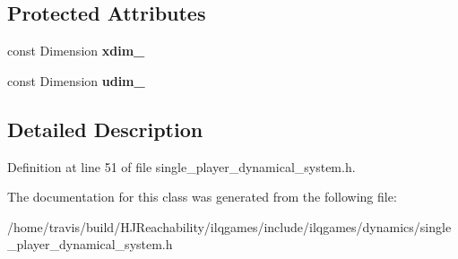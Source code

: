 \subsection*{Protected Attributes}
\begin{DoxyCompactItemize}
\item 
const Dimension {\bfseries xdim\+\_\+}\hypertarget{classilqgames_1_1_single_player_dynamical_system_a556a93c620d076cf36acd55aff69a02f}{}\label{classilqgames_1_1_single_player_dynamical_system_a556a93c620d076cf36acd55aff69a02f}

\item 
const Dimension {\bfseries udim\+\_\+}\hypertarget{classilqgames_1_1_single_player_dynamical_system_ad7058a359156f603a03323a3abf3de39}{}\label{classilqgames_1_1_single_player_dynamical_system_ad7058a359156f603a03323a3abf3de39}

\end{DoxyCompactItemize}


\subsection{Detailed Description}


Definition at line 51 of file single\+\_\+player\+\_\+dynamical\+\_\+system.\+h.



The documentation for this class was generated from the following file\+:\begin{DoxyCompactItemize}
\item 
/home/travis/build/\+H\+J\+Reachability/ilqgames/include/ilqgames/dynamics/single\+\_\+player\+\_\+dynamical\+\_\+system.\+h\end{DoxyCompactItemize}
